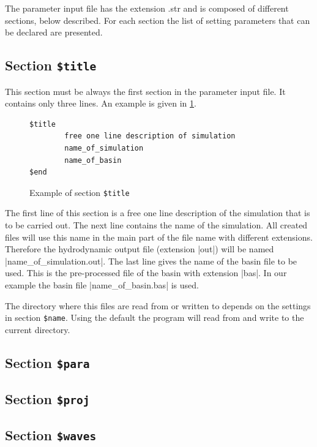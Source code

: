 The parameter input file has the extension .str and is composed of different sections, below described. For each section the list of setting parameters that can be declared are presented.
\subsection{Section {\tt \$title}}
\label{parameter}

This section must be always the first section in the parameter input file.
It contains only three lines. An example is given in
\Fig\ref{fig:titleexample}.

\begin{figure}[hbtp]
\begin{verbatim}
$title
        free one line description of simulation
        name_of_simulation
        name_of_basin
$end
\end{verbatim}
\caption{Example of section {\tt \$title}}
\label{fig:titleexample}
\end{figure}

The first line of this section is a free one line description of
the simulation that is to be carried out. The next line contains
the name of the simulation.
All created files will use this name in the main part of the file name
with different extensions. Therefore the hydrodynamic output file
(extension |out|) will be named |name_of_simulation.out|.
The last line gives the name of the basin file to be used. This
is the pre-processed file of the basin with extension |bas|.
In our example the basin file |name_of_basin.bas| is used.

The directory where this files are read from or written to depends
on the settings in section {\tt \$name}. Using the default
the program will read from and write to the current directory.

\subsection{Section {\tt \$para}}


\subsection{Section {\tt \$proj}}


\subsection{Section {\tt \$waves}}



